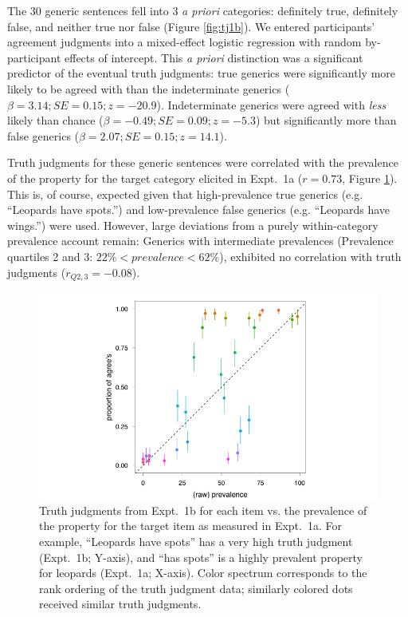 \documentclass[10pt,letterpaper]{article}
\begin{document}
The 30 generic sentences fell into 3 \emph{a priori} categories: definitely true, definitely false, and neither true nor false (Figure \ref{fig:tj1b}). 
We entered participants' agreement judgments into a mixed-effect logistic regression with random by-participant effects of intercept. 
This \emph{a priori} distinction was a significant predictor of the eventual truth judgments: true generics were significantly more likely to be agreed with than the indeterminate generics ($\beta = 3.14; SE = 0.15; z = -20.9$).
Indeterminate generics were agreed with \emph{less} likely than chance ($\beta = -0.49; SE = 0.09; z = -5.3$) but significantly more than false generics ($\beta = 2.07; SE = 0.15; z = 14.1$).

Truth judgments for these generic sentences were correlated with the prevalence of the property for the target category elicited in Expt.~1a ($r = 0.73$, Figure \ref{fig:scatterprev}). This is, of course, expected given that high-prevalence true generics (e.g. ``Leopards have spots.'') and low-prevalence false generics (e.g. ``Leopards have wings.'') were used. 
However, large deviations from a purely within-category prevalence account remain: Generics with intermediate prevalences (Prevalence quartiles 2 and 3: $ 22\% < prevalence < 62\%$), exhibited no correlation with truth judgments ($r_{Q2,3} = -0.08$).


\begin{figure}
\centering
    \includegraphics[width=0.8\columnwidth]{tj_n50_tjVsPrevalence}
    \caption{Truth judgments from Expt.~1b for each item vs. the prevalence of the property for the target item as measured in Expt.~1a. For example, ``Leopards have spots'' has a very high truth judgment (Expt.~1b; Y-axis), and ``has spots'' is a highly prevalent property for leopards (Expt.~1a; X-axis). Color spectrum corresponds to the rank ordering of the truth judgment data; similarly colored dots received similar truth judgments.}
  \label{fig:scatterprev}
\end{figure}
\end{document}
